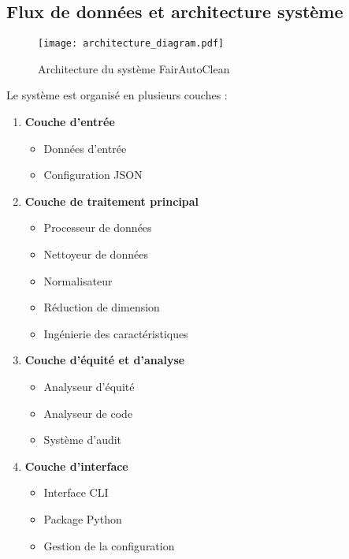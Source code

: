 \subsection{Flux de données et architecture système}

\begin{figure}[h]
\centering
\texttt{[image: architecture\_diagram.pdf]}
\caption{Architecture du système FairAutoClean}
\label{fig:architecture}
\end{figure}

Le système est organisé en plusieurs couches :

\begin{enumerate}
    \item \textbf{Couche d'entrée}
    \begin{itemize}
        \item Données d'entrée
        \item Configuration JSON
    \end{itemize}

    \item \textbf{Couche de traitement principal}
    \begin{itemize}
        \item Processeur de données
        \item Nettoyeur de données
        \item Normalisateur
        \item Réduction de dimension
        \item Ingénierie des caractéristiques
    \end{itemize}

    \item \textbf{Couche d'équité et d'analyse}
    \begin{itemize}
        \item Analyseur d'équité
        \item Analyseur de code
        \item Système d'audit
    \end{itemize}

    \item \textbf{Couche d'interface}
    \begin{itemize}
        \item Interface CLI
        \item Package Python
        \item Gestion de la configuration
    \end{itemize}


\end{enumerate}

